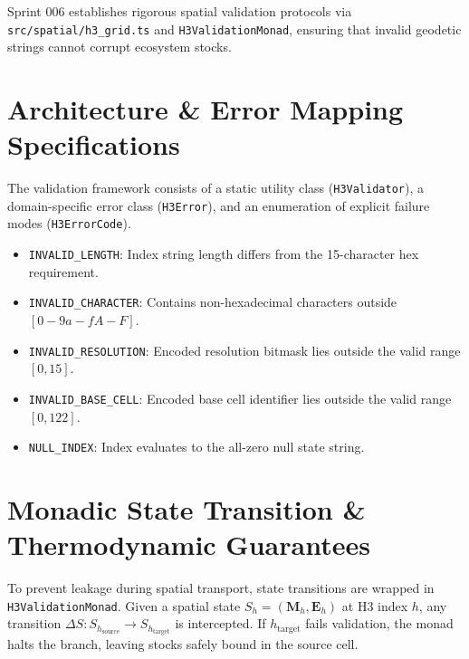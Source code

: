 \documentclass[11pt, a4paper]{article}
\begin{document}
Sprint 006 establishes rigorous spatial validation protocols via \texttt{src/spatial/h3\_grid.ts} and \texttt{H3ValidationMonad}, ensuring that invalid geodetic strings cannot corrupt ecosystem stocks.

\section{Architecture \& Error Mapping Specifications}
The validation framework consists of a static utility class (\texttt{H3Validator}), a domain-specific error class (\texttt{H3Error}), and an enumeration of explicit failure modes (\texttt{H3ErrorCode}).

\begin{itemize}
    \item \texttt{INVALID\_LENGTH}: Index string length differs from the 15-character hex requirement.
    \item \texttt{INVALID\_CHARACTER}: Contains non-hexadecimal characters outside $[0-9a-fA-F]$.
    \item \texttt{INVALID\_RESOLUTION}: Encoded resolution bitmask lies outside the valid range $[0, 15]$.
    \item \texttt{INVALID\_BASE\_CELL}: Encoded base cell identifier lies outside the valid range $[0, 122]$.
    \item \texttt{NULL\_INDEX}: Index evaluates to the all-zero null state string.
\end{itemize}

\section{Monadic State Transition \& Thermodynamic Guarantees}
To prevent leakage during spatial transport, state transitions are wrapped in \texttt{H3ValidationMonad}. Given a spatial state $S_h = (\mathbf{M}_h, \mathbf{E}_h)$ at H3 index $h$, any transition $\Delta S: S_{h_{\text{source}}} \rightarrow S_{h_{\text{target}}}$ is intercepted. If $h_{\text{target}}$ fails validation, the monad halts the branch, leaving stocks safely bound in the source cell.
\end{document}

